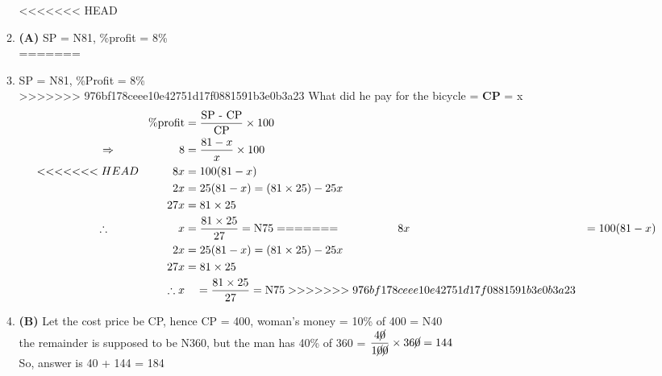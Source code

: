 \begin{multicols}{2}
\begin{enumerate}[label={\textbf{\arabic*.}}]
\begin{enumerate}[label={\arabic*.}]
<<<<<<< HEAD
    \item \textbf{(A)} SP = N81, \%profit = 8\% \\
=======
    \item SP = N81, \%Profit = 8\% \\
>>>>>>> 976bf178ceee10e42751d17f0881591b3e0b3a23
    What did he pay for the bicycle = \textbf{CP} = x \\
    \begin{align*}
    \%\text{profit} &= \dfrac{ \text{SP - CP}}{\text{CP}} \times 100  \\ 
    \Rightarrow \hspace{55px} 8 &= \dfrac{81 - x }{x} \times 100 \\
<<<<<<< HEAD
     \hspace{30px} 8x &= 100(81 - x)  \\
     \hspace{30px} 2x &= 25(81 - x ) = (81\times25) -25x \\
     \hspace{30px} 27x &= 81\times 25 \\
    \therefore \hspace{60px}  x &= \dfrac{81 \times 25}{27} = \text{N}75
=======
     \hspace{50px} 8x &= 100(81 - x)  \\
     \hspace{50px} 2x &= 25(81 - x ) = (81\times25) -25x \\
     \hspace{50px} 27x &= 81\times 25 \\
    \therefore  x &\quad = \dfrac{81 \times 25}{27} = \text{N}75
>>>>>>> 976bf178ceee10e42751d17f0881591b3e0b3a23
    \end{align*}

    \item \textbf{(B)}  Let the cost price be CP, hence CP = 400, woman's money = 10\% of 400 = N40 \\
    the remainder is supposed to be N360, but the man has 40\% of 360 = \(\dfrac{4\cancel{0}}{1\cancel{0}\cancel{0}} \times 36\cancel{0} = 144 \) \vspace {5px}\\
    So, answer is 40 + 144 = 184


\end{enumerate}
\end{enumerate}
\end{multicols}
